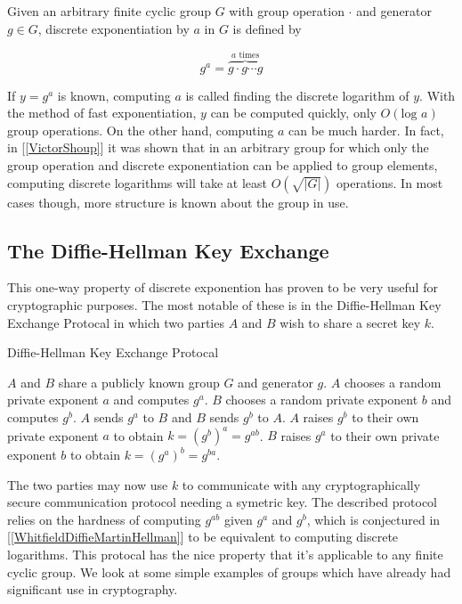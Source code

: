  Given an arbitrary finite cyclic group $G$ with group operation $\cdot$ and generator $g \in G$, discrete exponentiation by $a$ in $G$ is defined by 

$$
g^a = \overbrace{g \cdot g \cdots g}^{a \text{ times}}
$$

If $y = g^a$ is known, computing $a$ is called finding the discrete logarithm of $y$. With the method of fast exponentiation, $y$ can be computed quickly, only $O(\text{log } a)$ group operations. On the other hand, computing $a$ can be much harder. In fact, in [\ref{VictorShoup}] it was shown that in an arbitrary group for which only the group operation and discrete exponentiation can be applied to group elements, computing discrete logarithms will take at least $O(\sqrt{|G|})$ operations. In most cases though, more structure is known about the group in use.  

\subsection{The Diffie-Hellman Key Exchange}

This one-way property of discrete exponention has proven to be very useful for cryptographic purposes. The most notable of these is in the Diffie-Hellman Key Exchange Protocal in which two parties $A$ and $B$ wish to share a secret key $k$.

\begin{algorithm} 
	\caption{Diffie-Hellman Key Exchange Protocal}
	\begin{algorithmic}[1]
		\State $A$ and $B$ share a publicly known group $G$ and generator $g$.
		\State $A$ chooses a random private exponent $a$ and computes $g^a$.
		\State $B$ chooses a random private exponent $b$ and computes $g^b$.
		\State $A$ sends $g^a$ to $B$ and $B$ sends $g^b$ to $A$. 
		\State $A$ raises $g^b$ to their own private exponent $a$ to obtain $k = (g^b)^a = g^{ab}$.
		\State $B$ raises $g^a$ to their own private exponent $b$ to obtain $k = (g^a)^b = g^{ba}$.
	\end{algorithmic} 
\end{algorithm}  


The two parties may now use $k$ to communicate with any cryptographically secure communication protocol needing a symetric key. The described protocol relies on the hardness of computing $g^{ab}$ given $g^a$ and $g^b$, which is conjectured in [\ref{WhitfieldDiffieMartinHellman}] to be equivalent to computing discrete logarithms. This protocal has the nice property that it's applicable to any finite cyclic group. We look at some simple examples of groups which have already had significant use in cryptography.  

